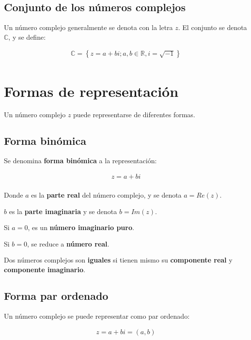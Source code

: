 \documentclass[12pt]{article}
\begin{document}
\subsection{Conjunto de los números complejos}

Un número complejo generalmente se denota con la letra \(z\).
El conjunto se denota \(\mathbb{C}\),
y se define:

\begin{align*}
    \mathbb{C} = \left\{z = a + bi; a,b \in \mathbb{R}, i = \sqrt{-1}\right\} \\
\end{align*}


\section{Formas de representación}

Un número complejo \(z\) puede representarse de diferentes formas.

\subsection{Forma binómica}

Se denomina \textbf{forma binómica} a la representación:

\begin{align*}
    z = a + bi \\
\end{align*}

Donde \(a\) es la \textbf{parte real} del número complejo,
y se denota \(a = Re(z)\).

\(b\) es la \textbf{parte imaginaria} y se denota \(b = Im(z)\).

Si \(a = 0\), es un \textbf{número imaginario puro}.

Si \(b = 0\), se reduce a \textbf{número real}.

Dos números complejos son \textbf{iguales} si tienen mismo
su \textbf{componente real} y \textbf{componente imaginario}.

\subsection{Forma par ordenado}

Un número complejo se puede representar como par ordenado:

\begin{align*}
    z = a + bi = (a,b) \\
\end{align*}
\end{document}
